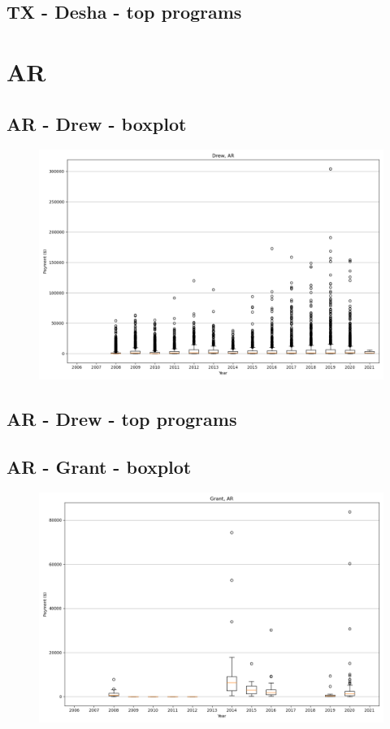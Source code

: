 \subsection*{TX - Desha - top programs}

\newpage
\section*{AR}
\subsection*{AR - Drew - boxplot}
\begin{figure}[h]
\centering
\includegraphics[width=7in]{../output/boxplots/counties/Drew-AR_boxplot.png}
\end{figure}


\subsection*{AR - Drew - top programs}

\newpage
\subsection*{AR - Grant - boxplot}
\begin{figure}[h]
\centering
\includegraphics[width=7in]{../output/boxplots/counties/Grant-AR_boxplot.png}
\end{figure}


